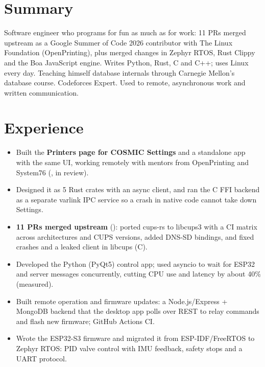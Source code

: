 \documentclass[10pt]{article}
\begin{document}

\section*{Summary}
Software engineer who programs for fun as much as for work: 11 PRs merged upstream as a Google Summer of Code 2026 contributor with The Linux Foundation (OpenPrinting), plus merged changes in Zephyr RTOS, Rust Clippy and the Boa JavaScript engine. Writes Python, Rust, C and C++; uses Linux every day. Teaching himself database internals through Carnegie Mellon's database course. Codeforces Expert. Used to remote, asynchronous work and written communication.

\section*{Experience}
\begin{itemize}
  \item Built the \textbf{Printers page for COSMIC Settings} and a standalone app with the same UI, working remotely with mentors from OpenPrinting and System76 (, in review).
  \item Designed it as 5 Rust crates with an async client, and ran the C FFI backend as a separate varlink IPC service so a crash in native code cannot take down Settings.
  \item \textbf{11 PRs merged upstream} (): ported cups-rs to libcups3 with a CI matrix across architectures and CUPS versions, added DNS-SD bindings, and fixed crashes and a leaked client in libcups (C).
\end{itemize}
\begin{itemize}
  \item Developed the Python (PyQt5) control app; used asyncio to wait for ESP32 and server messages concurrently, cutting CPU use and latency by about 40\% (measured).
  \item Built remote operation and firmware updates: a Node.js/Express + MongoDB backend that the desktop app polls over REST to relay commands and flash new firmware; GitHub Actions CI.
  \item Wrote the ESP32-S3 firmware and migrated it from ESP-IDF/FreeRTOS to Zephyr RTOS: PID valve control with IMU feedback, safety stops and a UART protocol.
\end{itemize}
\end{document}
